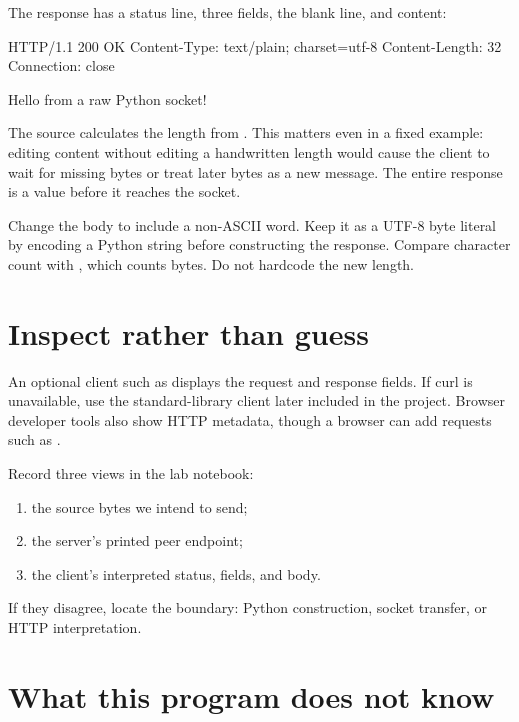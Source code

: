 The response has a status line, three fields, the blank line, and content:

\begin{wiremessage}
HTTP/1.1 200 OK
Content-Type: text/plain; charset=utf-8
Content-Length: 32
Connection: close

Hello from a raw Python socket!
\end{wiremessage}

The source calculates the length from . This matters even in a fixed
example: editing content without editing a handwritten length would cause the
client to wait for missing bytes or treat later bytes as a new message. The
entire response is a  value before it reaches the socket.

\begin{tryit}
Change the body to include a non-ASCII word. Keep it as a UTF-8 byte literal by
encoding a Python string before constructing the response. Compare character
count with , which counts bytes. Do not hardcode the new length.
\end{tryit}

\section{Inspect rather than guess}

An optional client such as  displays the
request and response fields. If curl is unavailable, use the standard-library
client later included in the project. Browser developer tools also show HTTP
metadata, though a browser can add requests such as .

Record three views in the lab notebook:

\begin{enumerate}
  \item the source bytes we intend to send;
  \item the server's printed peer endpoint;
  \item the client's interpreted status, fields, and body.
\end{enumerate}

If they disagree, locate the boundary: Python construction, socket transfer, or
HTTP interpretation.

\section{What this program does not know}

